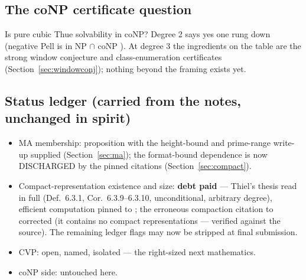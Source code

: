\documentclass[11pt]{amsart}
\theoremstyle{plain}
\theoremstyle{remark}
\begin{document}
\subsection{The coNP certificate question}\label{sec:conp}

Is pure cubic Thue solvability in coNP? Degree 2 says yes one rung
down (negative Pell is in NP $\cap$ coNP \cite{Lag79}). At degree 3
the ingredients on the table are the strong window conjecture and
class-enumeration certificates (Section~\ref{sec:windowconj});
nothing beyond the framing exists yet.

\subsection*{Status ledger (carried from the notes, unchanged in
spirit)}

\begin{itemize}
\item MA membership: proposition with the height-bound and
  prime-range write-up supplied (Section~\ref{sec:ma}); the
  format-bound dependence is now DISCHARGED by the pinned citations
  (Section~\ref{sec:compact}).
\item Compact-representation existence and size: \textbf{debt paid}
  --- Thiel's thesis read in full (Def.~6.3.1, Cor.~6.3.9--6.3.10,
  unconditional, arbitrary degree), efficient computation pinned to
  \cite[Alg.~7, Prop.~5.1]{BF14}; the erroneous compaction citation
  to \cite{Sch08} corrected (it contains no compact representations
  --- verified against the source). The remaining ledger flags may
  now be stripped at final submission.
\item CVP: open, named, isolated --- the right-sized next
  mathematics.
\item coNP side: untouched here.
\end{itemize}

\end{document}

